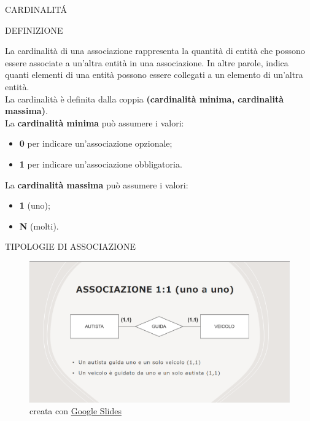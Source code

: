 \documentclass[aspectratio=1610]{beamer}
\begin{document}
\begin{frame}{CARDINALIT\'A}
    \begin{alertblock}{DEFINIZIONE}
        \begin{minipage}{0.98\linewidth}
            \justifying
            La cardinalità di una associazione rappresenta la quantità di 
            entità che possono essere associate a un'altra entità in una 
            associazione. In altre parole, indica quanti elementi di una entità 
            possono essere collegati a un elemento di un'altra entità.\\
            \pause
            La cardinalità è definita dalla coppia \textbf{(cardinalità minima, cardinalità massima)}.\\
            La \textbf{cardinalità minima} può assumere i valori:
            \begin{itemize}
                \item \textbf{0} per indicare un’associazione opzionale;
                \item \textbf{1} per indicare un’associazione obbligatoria.
            \end{itemize}
            La \textbf{cardinalità massima} può assumere i valori:
            \begin{itemize}
                \item \textbf{1} (uno);
                \item \textbf{N} (molti).
            \end{itemize}
        \end{minipage}
    \end{alertblock}
\end{frame}

\begin{frame}{TIPOLOGIE DI ASSOCIAZIONE}
    \begin{figure}
        \includegraphics[width=\linewidth]{img/1a1.png}
        \caption{{creata con \href{https://docs.google.com/presentation/}{Google Slides}}}
    \end{figure}
\end{frame}
\end{document}
